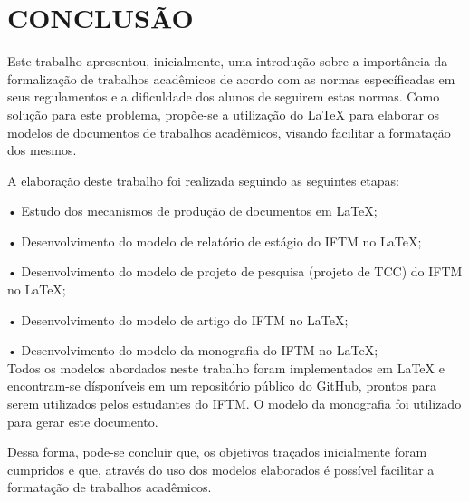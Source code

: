 \section{CONCLUSÃO}
Este trabalho apresentou, inicialmente, uma introdução sobre a importância da formalização de trabalhos acadêmicos de acordo com as normas específicadas em seus regulamentos e a dificuldade dos alunos de seguirem estas normas. Como solução para este problema, propõe-se a utilização do LaTeX para elaborar os modelos de documentos de trabalhos acadêmicos, visando facilitar a formatação dos mesmos.

A elaboração deste trabalho foi realizada seguindo as seguintes etapas:

•	Estudo dos mecanismos de produção de documentos em LaTeX;

•	Desenvolvimento do modelo de relatório de estágio do IFTM no LaTeX;

•	Desenvolvimento do modelo de projeto de pesquisa (projeto de TCC) do IFTM no LaTeX;

•	Desenvolvimento do modelo de artigo do IFTM no LaTeX;

•	Desenvolvimento do modelo da monografia do IFTM no LaTeX;\\

Todos os modelos abordados neste trabalho foram implementados em LaTeX e encontram-se dísponíveis em um repositório público do GitHub, prontos para serem utilizados pelos estudantes do IFTM. O modelo da monografia foi utilizado para gerar este documento. 

Dessa forma, pode-se concluir que, os objetivos traçados inicialmente foram cumpridos e que, através do uso dos modelos elaborados é possível facilitar a formatação de trabalhos acadêmicos.